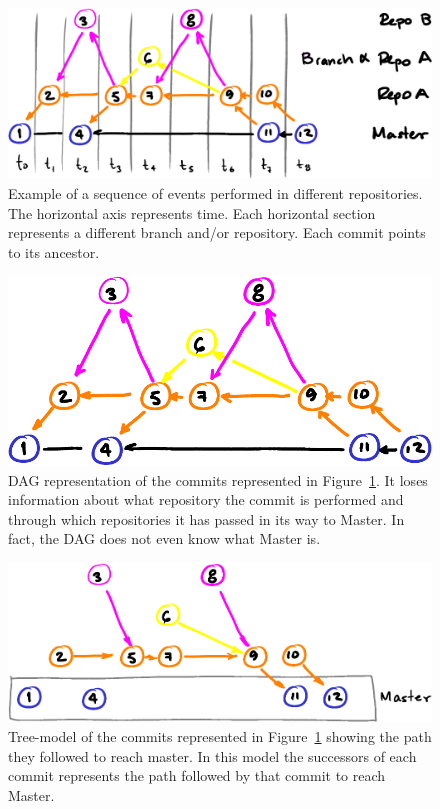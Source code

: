 \documentclass[conference, draftclsnofoot, draft]{IEEEtran}
\begin{document}



\begin{figure}[htbp]
  \centering
        \includegraphics[width=\columnwidth]{figures/events.pdf}
  \caption{Example of a sequence of events performed in different repositories. The horizontal axis represents time. Each horizontal section represents a
    different branch and/or repository. Each commit points to its ancestor.}
  \label{fig:repoEvents}
\end{figure}

\begin{figure}[htbp]
  \centering
        \includegraphics[width=.8\columnwidth]{figures/dag.pdf}
  \caption{DAG representation of the commits represented in Figure~\ref{fig:repoEvents}. It loses information about what repository the commit is performed and
    through which repositories it has passed in its way to Master. In fact, the DAG does not even know what Master is.}
  \label{fig:repoDAG}
\end{figure}

\begin{figure}[htbp]
  \centering
        \includegraphics[width=\columnwidth]{figures/tree.pdf}
  \caption{Tree-model of the commits  represented in Figure~\ref{fig:repoEvents} showing the path they followed to reach master. In this model the successors of
    each commit represents the path followed by that commit to reach Master.}
  \label{fig:repoTree}
\end{figure}
\end{document}
